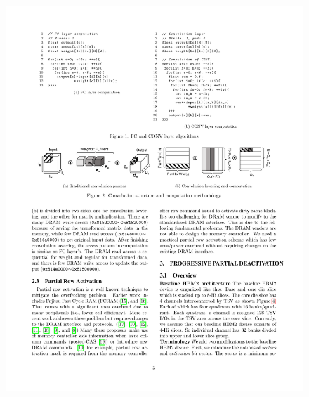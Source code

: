\begin{figure}[ht]
    \centering
    \begin{minipage}[t][]{0.46\linewidth}
        \includegraphics[]{figure/fc.pdf}
    \end{minipage}
    \begin{minipage}[t][]{0.46\linewidth}

\end{minipage}
\end{figure}
